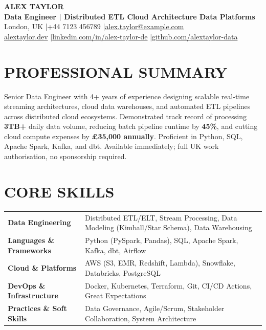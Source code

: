\documentclass[11pt,a4paper]{article}
\begin{document}
\begin{center}
    {\Huge \textbf{ALEX TAYLOR}} \\ \vspace{6pt}
    {\large \textbf{Data Engineer | Distributed ETL \textbullet{} Cloud Architecture \textbullet{} Data Platforms}} \\ \vspace{8pt}
    London, UK \quad|\quad +44 7123 456789 \quad|\quad \href{mailto:alex.taylor@example.com}{alex.taylor@example.com} \\ \vspace{4pt}
    \href{https://alextaylor.dev}{alextaylor.dev} \quad|\quad \href{https://linkedin.com/in/alex-taylor-de}{linkedin.com/in/alex-taylor-de} \quad|\quad \href{https://github.com/alextaylor-data}{github.com/alextaylor-data}
\end{center}

\section*{PROFESSIONAL SUMMARY}
Senior Data Engineer with 4+ years of experience designing scalable real-time streaming architectures, cloud data warehouses, and automated ETL pipelines across distributed cloud ecosystems. Demonstrated track record of processing \textbf{3TB+} daily data volume, reducing batch pipeline runtime by \textbf{45\%}, and cutting cloud compute expenses by \textbf{\pounds35,000 annually}. Proficient in Python, SQL, Apache Spark, Kafka, and dbt. Available immediately; full UK work authorisation, no sponsorship required.

\section*{CORE SKILLS}
\begin{tabularx}{\textwidth}{@{}l X@{}}
\textbf{Data Engineering} & Distributed ETL/ELT, Stream Processing, Data Modeling (Kimball/Star Schema), Data Warehousing \\
\textbf{Languages \& Frameworks} & Python (PySpark, Pandas), SQL, Apache Spark, Kafka, dbt, Airflow \\
\textbf{Cloud \& Platforms} & AWS (S3, EMR, Redshift, Lambda), Snowflake, Databricks, PostgreSQL \\
\textbf{DevOps \& Infrastructure} & Docker, Kubernetes, Terraform, Git, CI/CD Actions, Great Expectations \\
\textbf{Practices \& Soft Skills} & Data Governance, Agile/Scrum, Stakeholder Collaboration, System Architecture \\
\end{tabularx}
\end{document}
